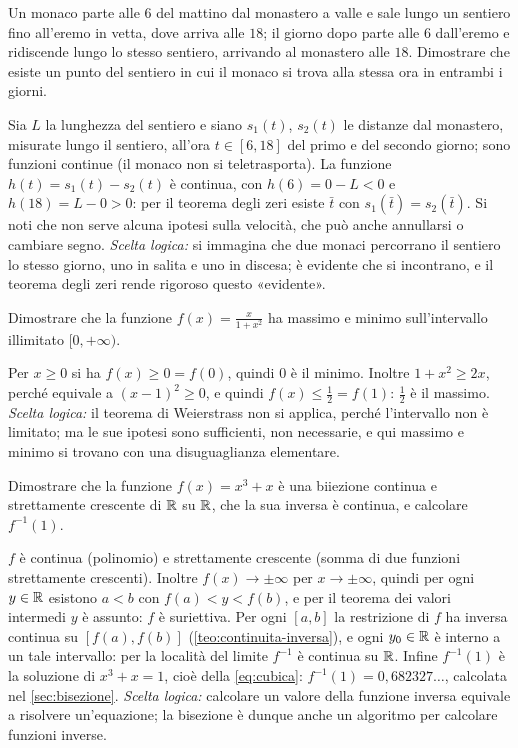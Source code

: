\begin{esercizio}
Un monaco parte alle $6$ del mattino dal monastero a valle e sale lungo un sentiero fino
all'eremo in vetta, dove arriva alle $18$; il giorno dopo parte alle $6$ dall'eremo e
ridiscende lungo lo stesso sentiero, arrivando al monastero alle $18$. Dimostrare che
esiste un punto del sentiero in cui il monaco si trova alla stessa ora in entrambi i
giorni.
\begin{soluzione}
Sia $L$ la lunghezza del sentiero e siano $s_{1}(t)$, $s_{2}(t)$ le distanze dal
monastero, misurate lungo il sentiero, all'ora $t\in[6,18]$ del primo e del secondo
giorno; sono funzioni continue (il monaco non si teletrasporta). La funzione
$h(t)=s_{1}(t)-s_{2}(t)$ è continua, con $h(6)=0-L<0$ e $h(18)=L-0>0$: per il teorema degli
zeri esiste $\bar t$ con $s_{1}(\bar t)=s_{2}(\bar t)$. Si noti che non serve alcuna
ipotesi sulla velocità, che può anche annullarsi o cambiare segno. \emph{Scelta logica:}
si immagina che due monaci percorrano il sentiero lo stesso giorno, uno in salita e uno
in discesa; è evidente che si incontrano, e il teorema degli zeri rende rigoroso questo
«evidente».
\end{soluzione}
\end{esercizio}

\begin{esercizio}
Dimostrare che la funzione $f(x)=\frac{x}{1+x^{2}}$ ha massimo e minimo sull'intervallo
illimitato $[0,+\infty)$.
\begin{soluzione}
Per $x\ge0$ si ha $f(x)\ge0=f(0)$, quindi $0$ è il minimo. Inoltre $1+x^{2}\ge2x$, perché
equivale a $(x-1)^{2}\ge0$, e quindi $f(x)\le\frac12=f(1)$: $\frac12$ è il massimo.
\emph{Scelta logica:} il teorema di Weierstrass non si applica, perché l'intervallo non è
limitato; ma le sue ipotesi sono sufficienti, non necessarie, e qui massimo e minimo si
trovano con una disuguaglianza elementare.
\end{soluzione}
\end{esercizio}

\begin{esercizio}
Dimostrare che la funzione $f(x)=x^{3}+x$ è una biiezione continua e strettamente
crescente di $\mathbb{R}$ su $\mathbb{R}$, che la sua inversa è continua, e calcolare $f^{-1}(1)$.
\begin{soluzione}
$f$ è continua (polinomio) e strettamente crescente (somma di due funzioni strettamente
crescenti). Inoltre $f(x)\to\pm\infty$ per $x\to\pm\infty$, quindi per ogni $y\in\mathbb{R}$
esistono $a<b$ con $f(a)<y<f(b)$, e per il teorema dei valori intermedi $y$ è assunto: $f$
è suriettiva. Per ogni $[a,b]$ la restrizione di $f$ ha inversa continua su $[f(a),f(b)]$
(\cref{teo:continuita-inversa}), e ogni $y_{0}\in\mathbb{R}$ è interno a un tale intervallo:
per la località del limite $f^{-1}$ è continua su $\mathbb{R}$. Infine $f^{-1}(1)$ è la soluzione
di $x^{3}+x=1$, cioè della \eqref{eq:cubica}: $f^{-1}(1)=0{,}682327\ldots$, calcolata nel
\cref{sec:bisezione}. \emph{Scelta logica:} calcolare un valore della funzione inversa
equivale a risolvere un'equazione; la bisezione è dunque anche un algoritmo per
calcolare funzioni inverse.
\end{soluzione}
\end{esercizio}

